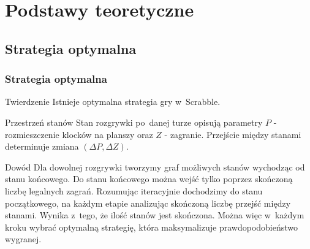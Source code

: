 \documentclass[10pt,a4paper]{beamer}
\begin{document}
\section{Podstawy teoretyczne}
\subsection{Strategia optymalna}

\begin{frame}
	\frametitle{Strategia optymalna}

	\begin{block}{Twierdzenie}	
		Istnieje optymalna strategia gry w~Scrabble.
	\end{block}

	\begin{block}{Przestrzeń stanów}	
		Stan rozgrywki po~danej turze opisują parametry $P$ - rozmieszczenie klocków na planszy oraz $Z$ - zagranie. Przejście między stanami determinuje zmiana $(\Delta P, \Delta Z)$.
	\end{block}

	\begin{block}{Dowód}	
		Dla dowolnej rozgrywki tworzymy graf możliwych stanów wychodząc 
		od stanu końcowego. Do stanu końcowego można wejść tylko poprzez skończoną liczbę legalnych zagrań. Rozumując iteracyjnie dochodzimy do stanu początkowego, na każdym etapie analizując skończoną liczbę przejść między stanami. Wynika z~tego, że ilość stanów jest skończona. Można więc w~każdym kroku wybrać optymalną strategię, która maksymalizuje prawdopodobieństwo wygranej.
	\end{block}
\end{frame}
\end{document}
